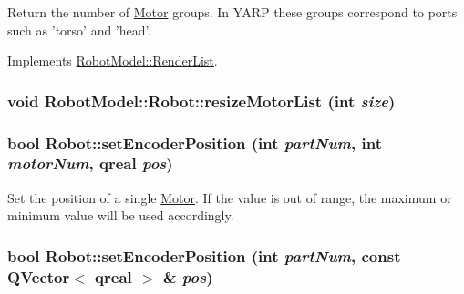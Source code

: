 Return the number of \hyperlink{class_robot_model_1_1_motor}{Motor} groups. In YARP these groups correspond to ports such as 'torso' and 'head'. 

Implements \hyperlink{class_robot_model_1_1_render_list_ac8646765beee22bf11582049dc3cf195}{RobotModel::RenderList}.\hypertarget{class_robot_model_1_1_robot_a2521948f148183c97428155be0eea923}{
\subsubsection[{resizeMotorList}]{\setlength{\rightskip}{0pt plus 5cm}void RobotModel::Robot::resizeMotorList (int {\em size})}}
\label{class_robot_model_1_1_robot_a2521948f148183c97428155be0eea923}
\hypertarget{class_robot_model_1_1_robot_a08017bce09f838437534aec53d615ff6}{
\subsubsection[{setEncoderPosition}]{\setlength{\rightskip}{0pt plus 5cm}bool Robot::setEncoderPosition (int {\em partNum}, \/  int {\em motorNum}, \/  qreal {\em pos})}}
\label{class_robot_model_1_1_robot_a08017bce09f838437534aec53d615ff6}


Set the position of a single \hyperlink{class_robot_model_1_1_motor}{Motor}. If the value is out of range, the maximum or minimum value will be used accordingly. \hypertarget{class_robot_model_1_1_robot_ad68d3bd2d8edbca49704f8a5b01055a1}{
\subsubsection[{setEncoderPosition}]{\setlength{\rightskip}{0pt plus 5cm}bool Robot::setEncoderPosition (int {\em partNum}, \/  const QVector$<$ qreal $>$ \& {\em pos})}}
\label{class_robot_model_1_1_robot_ad68d3bd2d8edbca49704f8a5b01055a1}


